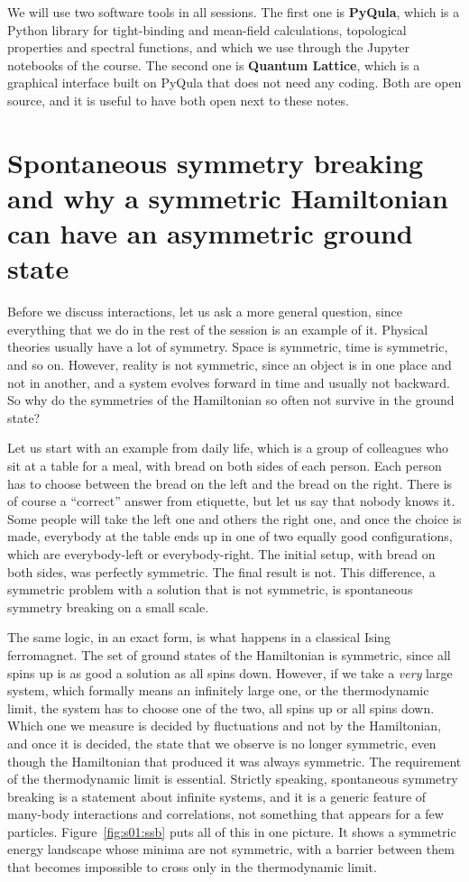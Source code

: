 We will use two software tools in all sessions. The first one is
\textbf{PyQula}, which is a Python library for tight-binding and mean-field calculations,
topological properties and spectral functions, and which we use through the Jupyter notebooks of
the course. The second one is \textbf{Quantum Lattice}, which is a graphical interface built on
PyQula that does not need any coding. Both are open source, and it is useful to have both open next
to these notes.

\section{Spontaneous symmetry breaking and why a symmetric Hamiltonian can have an asymmetric ground state}

Before we discuss interactions, let us ask a more general question, since everything that we do
in the rest of the session is an example of it. Physical theories usually have a lot of
symmetry. Space is symmetric, time is symmetric, and so on. However, reality is not symmetric,
since an object is in one place and not in another, and a system evolves forward in time and
usually not backward. So why do the symmetries of the Hamiltonian so often not survive in the
ground state?

Let us start with an example from daily life, which is a group of colleagues who sit at a
table for a meal, with bread on both sides of each person. Each person has to choose between the
bread on the left and the bread on the right. There is of course a ``correct'' answer from
etiquette, but let us say that nobody knows it. Some people will take the left one and others the
right one, and once the choice is made, everybody at the table ends up in one of two equally good
configurations, which are everybody-left or everybody-right. The initial setup, with bread on both
sides, was perfectly symmetric. The final result is not. This difference,
a symmetric problem with a solution that is not symmetric, is spontaneous symmetry breaking on a
small scale.

The same logic, in an exact form, is what happens in a classical Ising ferromagnet. The set of
ground states of the Hamiltonian is symmetric, since all spins up is as good a solution as all spins
down. However, if we take a \emph{very} large system, which formally means an infinitely large one,
or the thermodynamic limit, the system has to choose one of the two, all spins up or all spins down.
Which one we measure is decided by fluctuations and not by the Hamiltonian, and once it is decided,
the state that we observe is no longer symmetric, even though the Hamiltonian that produced it was
always symmetric. The requirement of the thermodynamic limit is essential. Strictly speaking,
spontaneous symmetry breaking is a statement about infinite systems, and it is a generic feature of
many-body interactions and correlations, not something that appears for a few particles.
Figure~\ref{fig:s01:ssb} puts all of this in one picture. It shows a symmetric energy landscape whose
minima are not symmetric, with a barrier between them that becomes impossible to cross only in the
thermodynamic limit.

